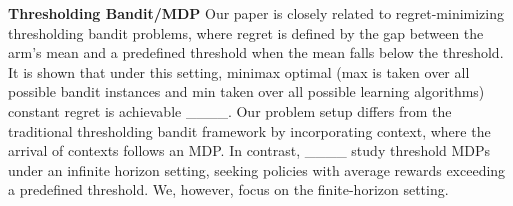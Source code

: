 \textbf{Thresholding Bandit/MDP\;\;} 
Our paper is closely related to regret-minimizing thresholding bandit problems, where regret is defined by the gap between the arm's mean and a predefined threshold when the mean falls below the threshold.
It is shown that under this setting, minimax optimal (max is taken over all possible bandit instances and min taken over all possible learning algorithms) constant regret is achievable ____. 
Our problem setup differs from the traditional thresholding bandit framework by incorporating context, where the arrival of contexts follows an MDP.
In contrast, ____ study threshold MDPs under an infinite horizon setting, seeking policies with average rewards exceeding a predefined threshold. We, however, focus on the finite-horizon setting.

